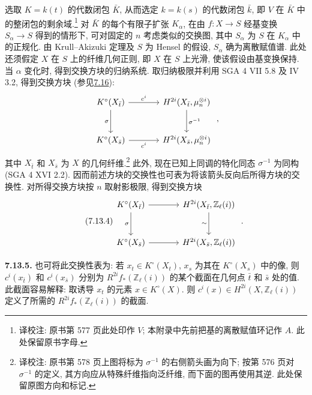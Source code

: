 选取 $K=k(t)$ 的代数闭包 $\bar K$, 从而选定 $k=k(s)$ 的代数闭包 $\bar k$, 即 $V$ 在 $\bar K$ 中的整闭包的剩余域.\footnote{译校注: 原书第 577 页此处印作 $V$; 本附录中先前把基的离散赋值环记作 $A$. 此处保留原书字母.} 对 $\bar K$ 的每个有限子扩张 $K_\alpha$, 在由 $f:X\to S$ 经基变换 $S_\alpha\to S$ 得到的情形下, 可对固定的 $n$ 考虑类似的交换图, 其中 $S_\alpha$ 为 $S$ 在 $K_\alpha$ 中的正规化. 由 Krull--Akizuki 定理及 $S$ 为 Hensel 的假设, $S_\alpha$ 确为离散赋值谱. 此处还须假定 $X$ 在 $S$ 上的纤维几何正则, 即 $X$ 在 $S$ 上光滑, 使该假设由基变换保持. 当 $\alpha$ 变化时, 得到交换方块的归纳系统. 取归纳极限并利用 SGA 4 VII 5.8 及 IV 3.2, 得到交换方块 (参见\hyperlink{sga6.e10.sec.7.16}{7.16}):
%
%
%
%
%
%
%
%
%
%
%
\[
\begin{tikzcd}[column sep=large,row sep=large]
K^\circ(X_{\bar t}) \arrow[r,"c^i"] \arrow[d,"\sigma"'] &
H^{2i}(X_{\bar t},\mu_n^{\otimes i}) \arrow[d,"\sigma^{-1}"]\\
K^\circ(X_{\bar s}) \arrow[r,"c^i"'] &
H^{2i}(X_{\bar s},\mu_n^{\otimes i})
\end{tikzcd}
\;,
\]
其中 $X_{\bar t}$ 和 $X_{\bar s}$ 为 $X$ 的几何纤维.\footnote{译校注: 原书第 578 页上图将标为 $\sigma^{-1}$ 的右侧箭头画为向下; 按第 576 页对 $\sigma^{-1}$ 的定义, 其方向应从特殊纤维指向泛纤维, 而下面的图再使用其逆. 此处保留原图方向和标记.} 此外, 现在已知上同调的特化同态 $\sigma^{-1}$ 为同构 (SGA 4 XVI 2.2). 因而前述方块的交换性也可表为将该箭头反向后所得方块的交换性. 对所得交换方块按 $n$ 取射影极限, 得到交换方块
%
%
%
%
%
\begin{equation}\tag{7.13.4}
\begin{tikzcd}[column sep=large,row sep=large]
K^\circ(X_{\bar t}) \arrow[r] \arrow[d,"\sigma"'] &
H^{2i}(X_{\bar t},\mathbb Z_\ell(i)) \arrow[d,"\sim"']\\
K^\circ(X_{\bar s}) \arrow[r] &
H^{2i}(X_{\bar s},\mathbb Z_\ell(i))
\end{tikzcd}
\;.
\end{equation}

\textbf{7.13.5.} 也可将此交换性表为: 若 $x_t\in K^\circ(X_t)$, $x_s$ 为其在 $K^\circ(X_s)$ 中的像, 则 $c^i(x_{\bar t})$ 和 $c^i(x_{\bar s})$ 分别为 $R^{2i}f_*(\mathbb Z_\ell(i))$ 的某个截面在几何点 $\bar t$ 和 $\bar s$ 处的值. 此截面容易解释: 取诱导 $x_t$ 的元素 $x\in K^\circ(X)$. 则 $c^i(x)\in H^{2i}(X,\mathbb Z_\ell(i))$ 定义了所需的 $R^{2i}f_*(\mathbb Z_\ell(i))$ 的截面.
%
%
%
%
%
%
%
%

